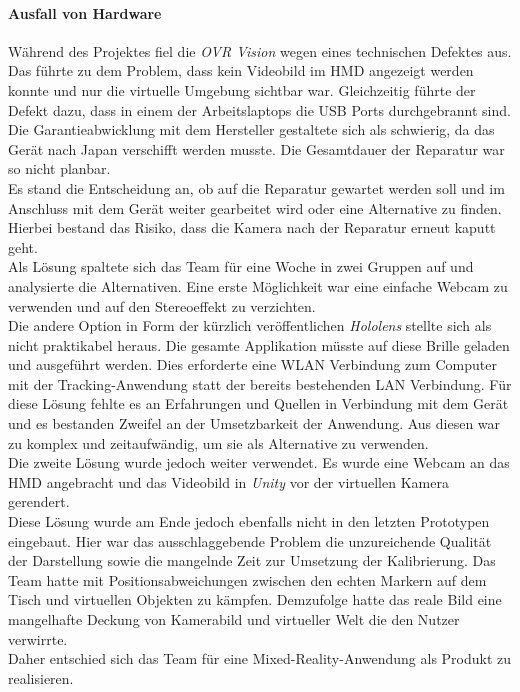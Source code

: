 \paragraph{Ausfall von Hardware} Während des Projektes fiel die \textit{OVR Vision} wegen eines technischen Defektes aus. Das führte zu dem Problem, dass kein Videobild im HMD angezeigt werden konnte und nur die virtuelle Umgebung sichtbar war. Gleichzeitig führte der Defekt dazu, dass in einem der Arbeitslaptops die USB Ports durchgebrannt sind. Die Garantieabwicklung mit dem Hersteller gestaltete sich als schwierig, da das Gerät nach Japan verschifft werden musste. Die Gesamtdauer der Reparatur war so nicht planbar. \\
Es stand die Entscheidung an, ob auf die Reparatur gewartet werden soll und im Anschluss mit dem Gerät weiter gearbeitet wird  oder eine Alternative zu finden. Hierbei bestand das Risiko, dass die Kamera nach der Reparatur erneut kaputt geht. \\
Als Lösung spaltete sich das Team für eine Woche in zwei Gruppen auf und analysierte die Alternativen. Eine erste Möglichkeit war eine einfache Webcam zu verwenden und auf den Stereoeffekt zu verzichten.\\
Die andere Option in Form der kürzlich veröffentlichen \textit{Hololens} stellte sich als nicht praktikabel heraus. Die gesamte Applikation müsste auf diese Brille geladen und ausgeführt werden. Dies erforderte eine WLAN Verbindung zum Computer mit der Tracking-Anwendung statt der bereits bestehenden LAN Verbindung. Für diese Lösung fehlte es an Erfahrungen und Quellen in Verbindung mit dem Gerät und es bestanden Zweifel an der Umsetzbarkeit der Anwendung. Aus diesen war zu komplex und zeitaufwändig, um sie als Alternative zu verwenden.\\
Die zweite Lösung wurde jedoch weiter verwendet. Es wurde eine Webcam an das HMD angebracht und das Videobild in \textit{Unity} vor der virtuellen Kamera gerendert.\\
Diese Lösung wurde am Ende jedoch ebenfalls nicht in den letzten Prototypen eingebaut. Hier war das ausschlaggebende Problem die unzureichende Qualität der Darstellung sowie die mangelnde Zeit zur Umsetzung der Kalibrierung. Das Team hatte mit Positionsabweichungen zwischen den echten Markern auf dem Tisch und virtuellen Objekten zu kämpfen. Demzufolge hatte das reale Bild eine mangelhafte Deckung von Kamerabild und virtueller Welt die den Nutzer verwirrte.\\
Daher entschied sich das Team für eine Mixed-Reality-Anwendung als Produkt zu realisieren.


